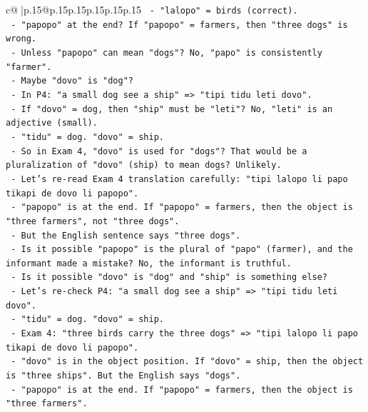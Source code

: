 \documentclass{article}
\begin{document}
{\begin{supertabular}{c@{$\;$}|p{.15\linewidth}@{}p{.15\linewidth}p{.15\linewidth}p{.15\linewidth}p{.15\linewidth}p{.15\linewidth}}
{{{\texttt{                    {-} "lalopo" = birds (correct).} \\
\texttt{                    {-} "papopo" at the end? If "papopo" = farmers, then "three dogs" is wrong.} \\
\texttt{                    {-} Unless "papopo" can mean "dogs"? No, "papo" is consistently "farmer".} \\
\texttt{                    {-} Maybe "dovo" is "dog"?} \\
\texttt{                    {-} In P4: "a small dog see a ship" => "tipi tidu leti dovo".} \\
\texttt{                      {-} If "dovo" = dog, then "ship" must be "leti"? No, "leti" is an adjective (small).} \\
\texttt{                      {-} "tidu" = dog. "dovo" = ship.} \\
\texttt{                    {-} So in Exam 4, "dovo" is used for "dogs"? That would be a pluralization of "dovo" (ship) to mean dogs? Unlikely.} \\
\texttt{                    {-} Let's re{-}read Exam 4 translation carefully: "tipi lalopo li papo tikapi de dovo li papopo".} \\
\texttt{                      {-} "papopo" is at the end. If "papopo" = farmers, then the object is "three farmers", not "three dogs".} \\
\texttt{                      {-} But the English sentence says "three dogs".} \\
\texttt{                      {-} Is it possible "papopo" is the plural of "papo" (farmer), and the informant made a mistake? No, the informant is truthful.} \\
\texttt{                      {-} Is it possible "dovo" is "dog" and "ship" is something else?} \\
\texttt{                      {-} Let's re{-}check P4: "a small dog see a ship" => "tipi tidu leti dovo".} \\
\texttt{                        {-} "tidu" = dog. "dovo" = ship.} \\
\texttt{                      {-} Exam 4: "three birds carry the three dogs" => "tipi lalopo li papo tikapi de dovo li papopo".} \\
\texttt{                        {-} "dovo" is in the object position. If "dovo" = ship, then the object is "three ships". But the English says "dogs".} \\
\texttt{                        {-} "papopo" is at the end. If "papopo" = farmers, then the object is "three farmers".} \\
}}}
\end{supertabular}}
\end{document}

